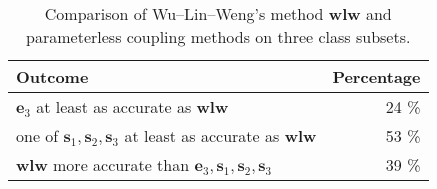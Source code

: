 \begin{table}[ht]
\centering
\begin{tabular}{lr}
  \hline
Outcome & Percentage \\ 
  \hline
 $\boldsymbol{e}_3$ at least as accurate as $\boldsymbol{wlw}$ & 24 \%   \\ 
  one of $\boldsymbol{s}_1, \boldsymbol{s}_2, \boldsymbol{s}_3$ at least as accurate as $\boldsymbol{wlw}$ & 53 \%   \\ 
  $\boldsymbol{wlw}$ more accurate than $\boldsymbol{e}_3, \boldsymbol{s}_1, \boldsymbol{s}_2, \boldsymbol{s}_3$ & 39 \%   \\ 
   \hline
\end{tabular}
\caption{Comparison of Wu--Lin--Weng's method $\boldsymbol{wlw}$ and  parameterless coupling methods on three class subsets. } 
\label{tab:step2}
\end{table}
